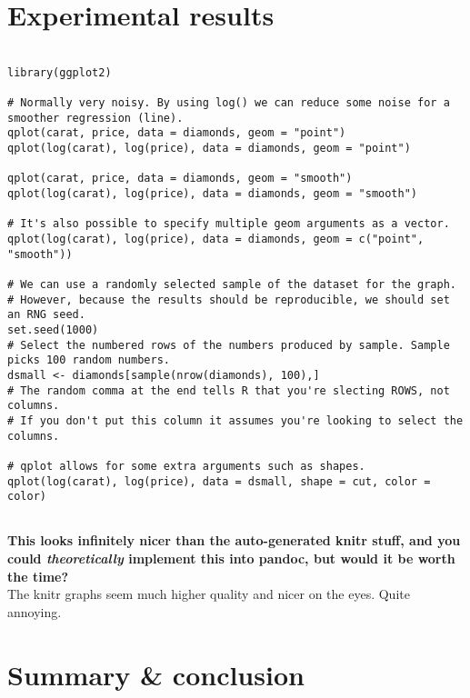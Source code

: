\documentclass[12pt]{report}
\begin{document}
    \chapter*{Experimental results}\label{ch:sec2}
    \begin{verbatim}

library(ggplot2)

# Normally very noisy. By using log() we can reduce some noise for a smoother regression (line).
qplot(carat, price, data = diamonds, geom = "point")
qplot(log(carat), log(price), data = diamonds, geom = "point")

qplot(carat, price, data = diamonds, geom = "smooth")
qplot(log(carat), log(price), data = diamonds, geom = "smooth")

# It's also possible to specify multiple geom arguments as a vector.
qplot(log(carat), log(price), data = diamonds, geom = c("point", "smooth"))

# We can use a randomly selected sample of the dataset for the graph.
# However, because the results should be reproducible, we should set an RNG seed.
set.seed(1000)
# Select the numbered rows of the numbers produced by sample. Sample picks 100 random numbers.
dsmall <- diamonds[sample(nrow(diamonds), 100),]
# The random comma at the end tells R that you're slecting ROWS, not columns.
# If you don't put this column it assumes you're looking to select the columns.

# qplot allows for some extra arguments such as shapes.
qplot(log(carat), log(price), data = dsmall, shape = cut, color = color)


    \end{verbatim}

    \large\textbf{This looks infinitely nicer than the auto-generated knitr stuff,
    and you could \textit{theoretically} implement this into pandoc, but would it be worth the time?}\\

    The knitr graphs seem much higher quality and nicer on the eyes.
    Quite annoying.

    \chapter*{Summary \& conclusion}\label{ch:sec3}
\end{document}
